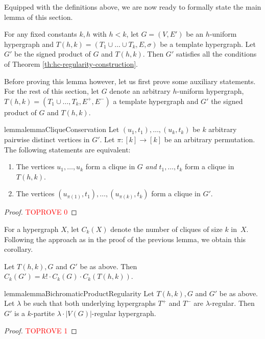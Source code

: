 \documentclass[a4paper,UKenglish,cleveref, autoref, thm-restate,numberwithinsect]{lipics-v2021}
\newcommand{\reg}{\lambda}
\begin{document}
\smallskip
Equipped with the definitions above, we are now ready to formally state the main lemma of this section.
\begin{lemma}\label{lemma:bichromatic-product}
    For any fixed constants $k,h$ with $h<k$, let $G = (V,E')$ be an $h$-uniform hypergraph and $T(h,k) = (T_1\cup \dots \cup T_k, E,\sigma)$ be a template hypergraph. Let $G'$ be the signed product of $G$ and $T(h,k)$. Then $G'$ satisfies all the conditions of Theorem \ref{th:hc-regularity-construction}.
\end{lemma}
Before proving this lemma however, let us first prove some auxiliary statements.
For the rest of this section, let $G$ denote an arbitrary $h$-uniform hypergraph, $T(h,k) = (T_1 \cup\dots,T_k,E^+,E^-)$ a template hypergraph and $G'$ the signed product of $G$ and $T(h,k)$.
\begin{restatable}{lemma}{lemmaCliqueConservation}\label{lemma:cliques-in-bichromatic-product}
    Let $(u_1,t_1), \dots, (u_k,t_k)$ be $k$ arbitrary pairwise distinct vertices in $G'$. Let $\pi:[k]\to [k]$ be an arbitrary permutation. The following statements are equivalent:
    \begin{enumerate}
      \item The vertices $u_{1}, \dots, u_k$ form a clique in $G$ \emph{and} $t_1, \dots, t_k$ form a clique in $T(h,k)$.
        \item The vertices $(u_{\pi(1)},t_1), \dots, (u_{\pi(k)},t_k)$ form a clique in $G'$.
    \end{enumerate}
\end{restatable}
\medskip
\begin{proof}\textcolor{red}{TOPROVE 0}\end{proof}


For a hypergraph $X$, let $C_k(X)$ denote the number of cliques of size $k$ in~$X$. 
Following the approach as in the proof of the previous lemma, we obtain this corollary.
\begin{corollary}
    Let $T(h,k), G$ and $G'$ be as above. Then $C_k(G') = k!\cdot C_k(G)\cdot C_k(T(h,k))$.
\end{corollary}
\begin{restatable}{lemma}{lemmaBichromaticProductRegularity}\label{lemma:regularity-of-bichromatic-product}
    Let $T(h,k), G$ and $G'$ be as above. Let $\reg$ be such that both underlying hypergraphs $T^+$ and $T^-$ are $\reg$-regular. Then $G'$ is a $k$-partite $\reg\cdot|V(G)|$-regular hypergraph.
\end{restatable}
\begin{proof}\textcolor{red}{TOPROVE 1}\end{proof}
\end{document}
